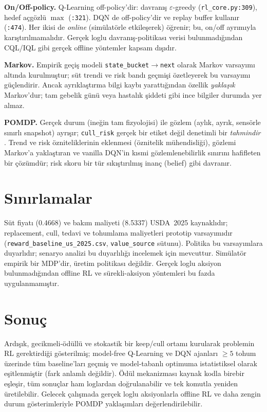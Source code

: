 \documentclass[conference]{IEEEtran}
\begin{document}
\textbf{On/Off-policy.} Q-Learning off-policy'dir: davranış $\varepsilon$-greedy
(\texttt{rl\_core.py:309}), hedef açgözlü $\max$ (\texttt{:321}). DQN de off-policy'dir ve
replay buffer kullanır (\texttt{:474}). Her ikisi de \emph{online} (simülatörle etkileşerek)
öğrenir; bu, on/off ayrımıyla karıştırılmamalıdır. Gerçek loglu davranış-politikası verisi
bulunmadığından CQL/IQL gibi gerçek offline yöntemler kapsam dışıdır.

\textbf{Markov.} Empirik geçiş modeli \texttt{state\_bucket}$\rightarrow$\texttt{next} olarak
Markov varsayımı altında kurulmuştur; süt trendi ve risk bandı geçmişi özetleyerek bu
varsayımı güçlendirir. Ancak ayrıklaştırma bilgi kaybı yarattığından özellik
\emph{yaklaşık} Markov'dur; tam gebelik günü veya hastalık şiddeti gibi ince bilgiler
durumda yer almaz.

\textbf{POMDP.} Gerçek durum (ineğin tam fizyolojisi) ile gözlem (aylık, ayrık, sensörle
sınırlı snapshot) ayrışır; \texttt{cull\_risk} gerçek bir etiket değil denetimli bir
\emph{tahmindir} \cite{kaelbling}. Trend ve risk özniteliklerinin eklenmesi (öznitelik
mühendisliği), gözlemi Markov'a yaklaştıran ve vanilla DQN'in kısmi gözlemlenebilirlik
sınırını hafifleten bir çözümdür; risk skoru bir tür sıkıştırılmış inanç (belief) gibi
davranır.

\section{Sınırlamalar}
\label{sec:limitations}
Süt fiyatı (0.4668) ve bakım maliyeti (8.5337) USDA~2025 kaynaklıdır; replacement, cull,
tedavi ve tohumlama maliyetleri prototip varsayımıdır
(\texttt{reward\_baseline\_us\_2025.csv}, \texttt{value\_source} sütunu). Politika bu
varsayımlara duyarlıdır; senaryo analizi bu duyarlılığı incelemek için mevcuttur.
Simülatör empirik bir MDP'dir, üretim politikası değildir. Gerçek loglu aksiyon
bulunmadığından offline RL ve sürekli-aksiyon yöntemleri bu fazda uygulanmamıştır.

\section{Sonuç}
Ardışık, gecikmeli-ödüllü ve stokastik bir keep/cull ortamı kurularak problemin RL
gerektirdiği gösterilmiş; model-free Q-Learning ve DQN ajanları $\geq5$ tohum üzerinde
tüm baseline'ları geçmiş ve model-tabanlı optimuma istatistiksel olarak eşitlenmiştir (fark anlamlı değildir). Ödül mekanizması
kaynak kodla birebir eşleşir, tüm sonuçlar ham loglardan doğrulanabilir ve tek komutla
yeniden üretilebilir. Gelecek çalışmada gerçek loglu aksiyonlarla offline RL ve daha zengin
durum gösterimleriyle POMDP yaklaşımları değerlendirilebilir.
\end{document}
